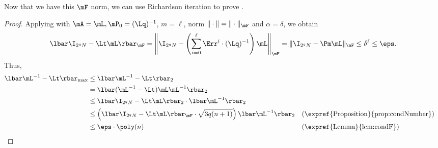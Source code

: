 Now that we have this $\mF$ norm, we can use Richardson iteration to prove .
\begin{proof}
Applying  with $\mA=\mL,\mP_0=(\Lq)^{-1}$, $m=\ell $, norm $\|\cdot\|=\|\cdot\|_\mF$ and $\alpha=\delta$, we obtain
\[\lbar\I_{2^qN}-\Lt \mL\rbar_\mF = \left\|\I_{2^qN}-\left(\sum_{i=0}^\ell \Err^i\cdot (\Lq)^{-1}\right)\mL\right\|_\mF
    = \|\I_{2^qN}-\Pm\mL\|_\mF
    \leq \delta^\ell
    \leq \eps.\]
Thus,
\begin{align*}
    \lbar\mL^{-1}-\Lt\rbar_{\max} &\leq \lbar\mL^{-1}-\Lt\rbar_{2}\\
    &= \lbar(\mL^{-1}-\Lt)\mL \mL^{-1}\rbar_2\\
    &\leq \lbar\I_{2^qN}-\Lt\mL\rbar_2\cdot\lbar\mL^{-1}\rbar_2\\
    &\leq \left(\lbar\I_{2^qN}-\Lt\mL\rbar_\mF\cdot \sqrt{3q(n+1)}\right) \lbar\mL^{-1}\rbar_2&& \text{(\expref{Proposition}{prop:condNumber})}\\
    &\leq \eps \cdot\poly(n) && \text{(\expref{Lemma}{lem:condF})}\qedhere
\end{align*}
\end{proof}

